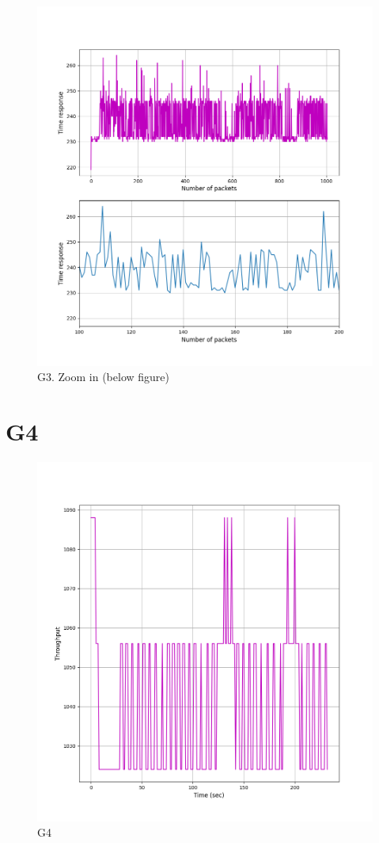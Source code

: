 \documentclass[hidelinks, 12pt, a4paper]{article}
\begin{document}
\begin{figure}[h!]
\centering
	\includegraphics[height=.38\textheight, width=\textwidth]{assets/session1/g3.png}
    \caption{G3. Zoom in (below figure)} 
\end{figure}

\section{G4}

\begin{figure}[h!]
\centering
	\includegraphics[height=.38\textheight, width=\textwidth]{assets/session1/g4.png}
	\caption{G4} 
\end{figure}
\end{document}
